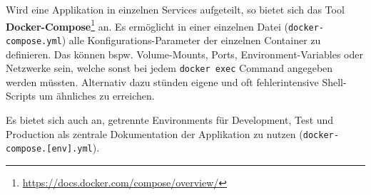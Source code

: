 \par
Wird eine Applikation in einzelnen Services aufgeteilt, so bietet sich das Tool \textbf{Docker-Compose}\footnote{\url{https://docs.docker.com/compose/overview/}} an.
Es ermöglicht in einer einzelnen Datei (\texttt{docker-compose.yml}) alle Konfigurations-Parameter der einzelnen Container zu definieren.
Das können \ac{bspw.} Volume-Mounts, Ports, Environment-Variables oder Netzwerke sein, welche sonst bei jedem \texttt{docker exec} Command angegeben werden müssten.
Alternativ dazu stünden eigene und oft fehlerintensive Shell-Scripts um ähnliches zu erreichen. 
\par
Es bietet sich auch an, getrennte Environments für Development, Test und Production als zentrale Dokumentation der Applikation zu nutzen (\texttt{docker-\break compose.[env].yml}).

